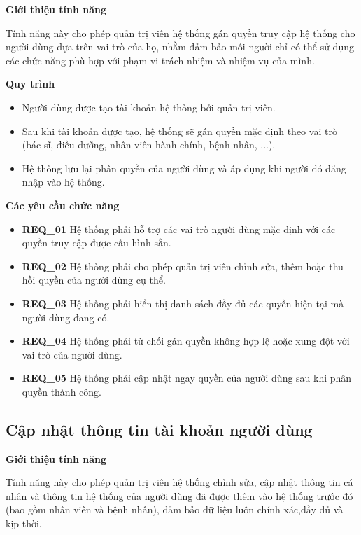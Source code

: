 \noindent \textbf{Giới thiệu tính năng}

Tính năng này cho phép quản trị viên hệ thống gán quyền truy cập hệ thống cho người dùng dựa trên vai trò của họ, nhằm đảm bảo mỗi người chỉ có thể sử dụng các chức năng phù hợp với phạm vi trách nhiệm và nhiệm vụ của mình.

\noindent \textbf{Quy trình}

\begin{itemize}
  \item Người dùng được tạo tài khoản hệ thống bởi quản trị viên.

  \item Sau khi tài khoản được tạo, hệ thống sẽ gán quyền mặc định theo vai trò (bác sĩ, điều dưỡng, nhân viên hành chính, bệnh nhân, ...).

  \item Hệ thống lưu lại phân quyền của người dùng và áp dụng khi người đó đăng nhập vào hệ thống.
\end{itemize}

\noindent \textbf{Các yêu cầu chức năng}

\begin{itemize}
  \item \textbf{REQ\_01} Hệ thống phải hỗ trợ các vai trò người dùng mặc định với các quyền truy cập được cấu hình sẵn.

  \item \textbf{REQ\_02} Hệ thống phải cho phép quản trị viên chỉnh sửa, thêm hoặc thu hồi quyền của người dùng cụ thể.

  \item \textbf{REQ\_03} Hệ thống phải hiển thị danh sách đầy đủ các quyền hiện tại mà người dùng đang có.

  \item \textbf{REQ\_04} Hệ thống phải từ chối gán quyền không hợp lệ hoặc xung đột với vai trò của người dùng.

  \item \textbf{REQ\_05} Hệ thống phải cập nhật ngay quyền của người dùng sau khi phân quyền thành công.
\end{itemize}

\subsection{Cập nhật thông tin tài khoản người dùng}

\noindent \textbf{Giới thiệu tính năng}

Tính năng này cho phép quản trị viên hệ thống chỉnh sửa, cập nhật thông tin cá nhân và thông tin hệ thống của người dùng đã được thêm vào hệ thống trước đó (bao gồm nhân viên và bệnh nhân), đảm bảo dữ liệu luôn chính xác,đầy đủ và kịp thời.

